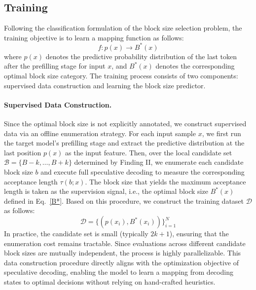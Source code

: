 \documentclass{article}
\begin{document}
\subsection{Training}
Following the classification formulation of the block size selection problem, the training objective is to learn a mapping function as follows:
\begin{equation}
f : p(x) \rightarrow B^*(x)
\end{equation}
where $p(x)$ denotes the predictive probability distribution of the last token after the prefilling stage for input $x$, and $B^*(x)$ denotes the corresponding optimal block size category. The training process consists of two components: supervised data construction and learning the block size predictor.


\paragraph{Supervised Data Construction.}
Since the optimal block size is not explicitly annotated, we construct supervised data via an offline enumeration strategy. For each input sample $x$, we first run the target model’s prefilling stage and extract the predictive distribution at the last position $p(x)$ as the input feature. Then, over the local candidate set $\mathcal{B} = \{B - k, \ldots, B + k\}$ determined by Finding II, we enumerate each candidate block size $b$ and execute full speculative decoding to measure the corresponding acceptance length $\tau(b; x)$. The block size that yields the maximum acceptance length is taken as the supervision signal, i.e., the optimal block size $B^*(x)$ defined in Eq.~\ref{B*}. Based on this procedure, we construct the training dataset $\mathcal{D}$ as follows:
\begin{equation}
\mathcal{D} = \{(p(x_i), B^*(x_i))\}_{i=1}^N
\end{equation}
In practice, the candidate set is small (typically $2k + 1 $), ensuring that the enumeration cost remains tractable. Since evaluations across different candidate block sizes are mutually independent, the process is highly parallelizable. This data construction procedure directly aligns with the optimization objective of speculative decoding, enabling the model to learn a mapping from decoding states to optimal decisions without relying on hand-crafted heuristics.
\end{document}
